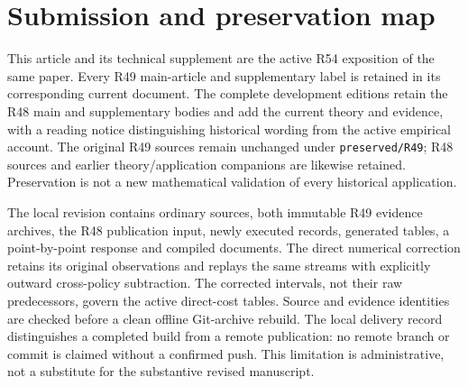 \documentclass[ecta,nameyear,draft]{econsocart}
\begin{document}
\section{Submission and preservation map}\label{sec:map49}
This article and its technical supplement are the active R54 exposition of the same paper. Every R49 main-article and supplementary label is retained in its corresponding current document. The complete development editions retain the R48 main and supplementary bodies and add the current theory and evidence, with a reading notice distinguishing historical wording from the active empirical account. The original R49 sources remain unchanged under \texttt{preserved/R49}; R48 sources and earlier theory/application companions are likewise retained. Preservation is not a new mathematical validation of every historical application.

The local revision contains ordinary sources, both immutable R49 evidence archives, the R48 publication input, newly executed records, generated tables, a point-by-point response and compiled documents. The direct numerical correction retains its original observations and replays the same streams with explicitly outward cross-policy subtraction. The corrected intervals, not their raw predecessors, govern the active direct-cost tables. Source and evidence identities are checked before a clean offline Git-archive rebuild. The local delivery record distinguishes a completed build from a remote publication: no remote branch or commit is claimed without a confirmed push. This limitation is administrative, not a substitute for the substantive revised manuscript.









\end{document}
